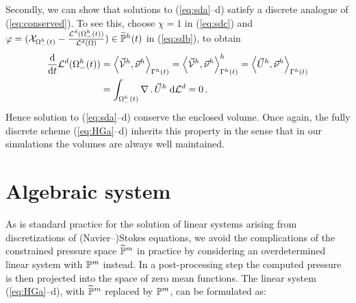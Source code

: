 Secondly, we can show that solutions to (\ref{eq:sda}--d) satisfy a discrete
analogue of (\ref{eq:conserved}). To see this, choose $\chi = 1$ in
(\ref{eq:sdc}) and $\varphi= (\mathrm{\mathcal{X}}_{\Omega_-^h(t)} -
\frac{\mathcal{L}^d(\Omega_-^h(t))}{\mathcal{L}^d(\Omega)})
\in \widetilde{\mathbb{P}}^h(t)$ in (\ref{eq:sdb}), to obtain
\begin{align*}
\frac{\rm d}{{\rm d}t} \mathcal{L}^d(\Omega_-^h(t))  &=
\left\langle \vec{\mathcal{V}}^h , \vec\nu^h \right\rangle_{\Gamma^h(t)}
= \left\langle \vec{\mathcal{V}}^h , \vec\nu^h \right\rangle^h_{\Gamma^h(t)}
= \left\langle \vec U^h, \vec\nu^h \right\rangle_{\Gamma^h(t)} \\ &
= \int_{\Omega_-^h(t)} \nabla\,.\,\vec U^h \;{\rm d}{\cal L}^{d} =0\,.
\end{align*}
Hence solution to (\ref{eq:sda}--d) conserve the enclosed volume. Once again,
the fully discrete scheme (\ref{eq:HGa}--d) inherits this property in the sense
that in our simulations the volumes are always well maintained.

\section{Algebraic system}\label{sec:stokes_algebraic_system}
As is standard practice for the solution of linear systems arising from
discretizations of (Navier--)Stokes equations, we avoid the complications of the
constrained pressure space $\widetilde{\mathbb{P}}^m$ in practice by considering an
overdetermined linear system with $\mathbb{P}^m$ instead.
In a post-processing step the computed pressure is
then projected into the space of zero mean functions. The linear system
(\ref{eq:HGa}--d), with $\widetilde{\mathbb{P}}^m$ replaced by $\mathbb{P}^m$, can be
formulated as:

